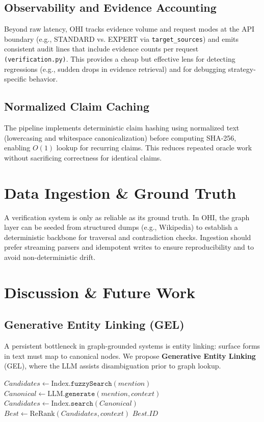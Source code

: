 \documentclass[10pt,a4paper,twocolumn]{article}
\begin{document}
\subsection{Observability and Evidence Accounting}
Beyond raw latency, OHI tracks evidence volume and request modes at the API boundary (e.g., STANDARD vs. EXPERT via \texttt{target\_sources}) and emits consistent audit lines that include evidence counts per request \texttt{(verification.py)}. This provides a cheap but effective lens for detecting regressions (e.g., sudden drops in evidence retrieval) and for debugging strategy-specific behavior.

\subsection{Normalized Claim Caching}
The pipeline implements deterministic claim hashing using normalized text (lowercasing and whitespace canonicalization) before computing SHA-256, enabling $O(1)$ lookup for recurring claims. This reduces repeated oracle work without sacrificing correctness for identical claims.

\section{Data Ingestion \& Ground Truth}
A verification system is only as reliable as its ground truth. In OHI, the graph layer can be seeded from structured dumps (e.g., Wikipedia) to establish a deterministic backbone for traversal and contradiction checks. Ingestion should prefer streaming parsers and idempotent writes to ensure reproducibility and to avoid non-deterministic drift.

\section{Discussion \& Future Work}

\subsection{Generative Entity Linking (GEL)}
A persistent bottleneck in graph-grounded systems is entity linking: surface forms in text must map to canonical nodes. We propose \textbf{Generative Entity Linking} (GEL), where the LLM assists disambiguation prior to graph lookup.

\begin{algorithm}[H]
\caption{Generative Entity Linking (GEL)}
\label{alg:gel}
\begin{algorithmic}[1]
  \State $Candidates \gets \mathrm{Index}.\texttt{fuzzySearch}(mention)$
    \State $Canonical \gets \mathrm{LLM}.\texttt{generate}(mention, context)$
    \State $Candidates \gets \mathrm{Index}.\texttt{search}(Canonical)$
  \EndIf
  \State $Best \gets \mathrm{ReRank}(Candidates, context)$
  \State \Return $Best.ID$
\EndFunction
\end{algorithmic}
\end{algorithm}
\end{document}
